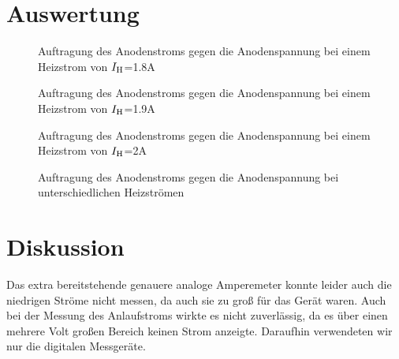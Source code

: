 \documentclass[12pt,a4paper,titlepage,headinclude,bibtotoc]{scrartcl}
\begin{document}
\section{Auswertung}
\label{sec:auswertung}
\begin{figure}[!h]
	\centering
	
	\caption{Auftragung des Anodenstroms gegen die Anodenspannung bei einem Heizstrom von $I_\text H$=1.8A}
	\label{fig:h18}
\end{figure}
\begin{figure}[!h]
	\centering
	
	\caption{Auftragung des Anodenstroms gegen die Anodenspannung bei einem Heizstrom von $I_\text H$=1.9A}
	\label{fig:h19}
\end{figure}
\begin{figure}[!h]
	\centering
	
	\caption{Auftragung des Anodenstroms gegen die Anodenspannung bei einem Heizstrom von $I_\text H$=2A}
	\label{fig:h2}
\end{figure}
\begin{figure}[!h]
	\centering
	
	\caption{Auftragung des Anodenstroms gegen die Anodenspannung bei unterschiedlichen Heizströmen}
	\label{fig:h}
\end{figure}

\section{Diskussion}
\label{sec:diskussion}
Das extra bereitstehende genauere analoge Amperemeter konnte leider auch die niedrigen Ströme nicht messen, da auch sie zu groß für das Gerät waren.
Auch bei der Messung des Anlaufstroms wirkte es nicht zuverlässig, da es über einen mehrere Volt großen Bereich keinen Strom anzeigte.
Daraufhin verwendeten wir nur die digitalen Messgeräte.



\end{document}
